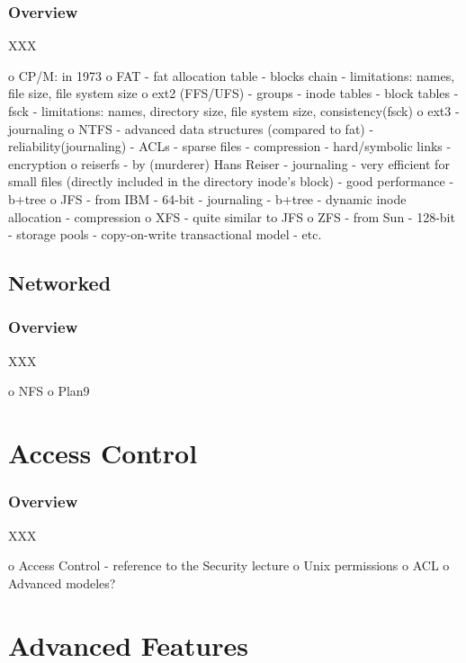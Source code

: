 
\begin{frame}
  \frametitle{Overview}

  XXX
\end{frame}

 o CP/M: in 1973
 o FAT
  - fat allocation table
  - blocks chain
  - limitations: names, file size, file system size
 o ext2 (FFS/UFS)
  - groups
  - inode tables
  - block tables
  - fsck
  - limitations: names, directory size, file system size, consistency(fsck)
 o ext3
  - journaling
 o NTFS
  - advanced data structures (compared to fat)
  - reliability(journaling)
  - ACLs
  - sparse files
  - compression
  - hard/symbolic links
  - encryption
 o reiserfs
  - by (murderer) Hans Reiser
  - journaling
  - very efficient for small files (directly included in the directory inode's block)
  - good performance
  - b+tree
 o JFS
  - from IBM
  - 64-bit
  - journaling
  - b+tree
  - dynamic inode allocation
  - compression
 o XFS
  - quite similar to JFS
 o ZFS
  - from Sun
  - 128-bit
  - storage pools
  - copy-on-write transactional model
  - etc.


\subsection{Networked}


\begin{frame}
  \frametitle{Overview}

  XXX
\end{frame}

 o NFS
 o Plan9

%
%

\section{Access Control}


\begin{frame}
  \frametitle{Overview}

  XXX
\end{frame}

o Access Control
 - reference to the Security lecture
 o Unix permissions
 o ACL
 o Advanced modeles?

%
%

\section{Advanced Features}

